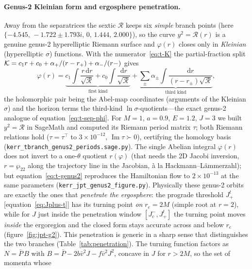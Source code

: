\documentclass[12pt]{iopart}
\theoremstyle{plain}
\theoremstyle{definition}
\theoremstyle{remark}
\newcommand{\rp}{r_{+}}
\newcommand{\dd}{\mathrm{d}}
\begin{document}
\paragraph{Genus-2 Kleinian form and ergosphere penetration.} Away from the
separatrices the sextic $\mathcal R$ keeps six \emph{simple} branch points
(here $\{-4.545,\,-1.722\pm1.793i,\,0,\,1.444,\,2.000\}$), so the curve
$y^2=\mathcal R(r)$ is a genuine genus-2 hyperelliptic Riemann surface and
$\varphi(r)$ closes only in \emph{Kleinian} (hyperelliptic $\sigma$) functions.
With the numerator~\eqref{eq:t-K} the partial-fraction split
$\mathcal K=c_1 r+c_0+\alpha_+/(r-\rp)+\alpha_-/(r-\rm)$ gives
\begin{equation}
    \varphi(r)=\underbrace{c_1\!\!\int\!\frac{r\,\dd r}{\sqrt{\mathcal R}}
      +c_0\!\!\int\!\frac{\dd r}{\sqrt{\mathcal R}}}_{\text{first kind}}
      +\underbrace{\sum_{\pm}\alpha_\pm\!\!\int\!
      \frac{\dd r}{(r-r_\pm)\sqrt{\mathcal R}}}_{\text{third kind}},
    \label{eq:t-genus2}
\end{equation}
the holomorphic pair being the Abel-map coordinates (arguments of the Kleinian
$\sigma$) and the horizon terms the third-kind $\ln\sigma$-quotients---the exact
genus-2 analogue of equation~\eqref{eq:t-sep-phi}. For $M=1$, $a=0.9$, $E=1.2$, $J=3$ we
built $y^2=\mathcal R$ in SageMath and computed its Riemann period matrix
$\tau$; both Riemann relations hold ($\tau=\tau^\top$ to $3\times10^{-12}$,
$\operatorname{Im}\tau\succ0$), certifying the homology basis
(\texttt{kerr\_tbranch\_genus2\_periods.sage.py}). The single Abelian integral $\varphi(r)$ does not invert to a
one-$\theta$ quotient $r(\varphi)$ (that needs the 2D Jacobi inversion,
$r=\wp_{22}$ along the trajectory line in the Jacobian, à la
Hackmann--L\"ammerzahl); but equation~\eqref{eq:t-genus2} reproduces the Hamiltonian
flow to $2\times10^{-13}$ at the same parameters (\texttt{kerr\_jpt\_genus2\_figure.py}). Physically these genus-2 orbits are exactly the ones
that \emph{penetrate the ergosphere}: the prograde threshold $J_+^t$
[equation~\eqref{eq:Jplus-t}] has its turning point \emph{on} $r_e=2M$ (simple root at
$r=2$), while for $J$ just inside the penetration window $[J_c^-,J_+^t]$ the turning
point moves \emph{inside} the ergoregion and the closed form stays accurate
across and below $r_e$ (figure~\ref{fig:jpt-g2}). This penetration is generic in a
sharp sense that distinguishes the two branches (Table~\ref{tab:penetration}). The
turning function factors as $N=\bar P\,B$ with
$B=\bar P-2b\bar v^2J-f\bar v^2J^2$, concave in $J$ for $r>2M$, so the set of momenta whose
\end{document}

